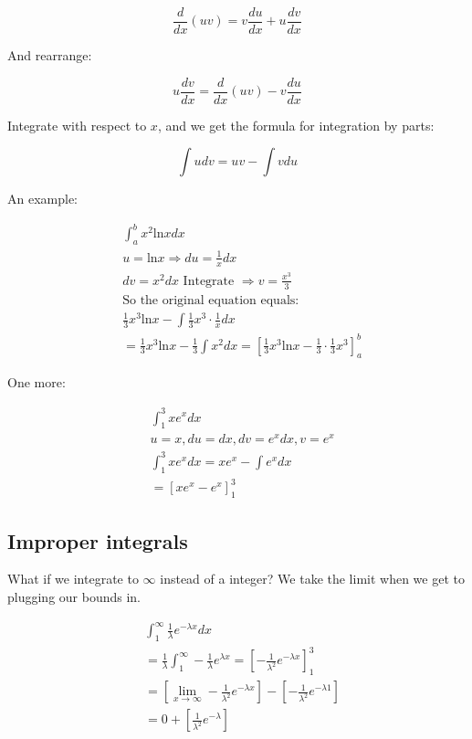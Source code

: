 \begin{equation*}
    \frac{d}{dx}(uv) = v \frac{du}{dx} + u \frac{dv}{dx} 
\end{equation*}

And rearrange: 

\begin{equation*}
    u \frac{dv}{dx} = \frac{d}{dx}(uv) - v \frac{du}{dx}
\end{equation*}

Integrate with respect to $x$, and we get the formula for integration by parts:

\begin{equation*}
    \int u dv = uv - \int v du
\end{equation*}

An example: 

\begin{align*}
    &\int_a^b x^2 \text{ln}x dx \\
    &u = \text{ln}x \Rightarrow du = \frac{1}{x}dx \\
    &dv = x^2 dx \text{ Integrate } \Rightarrow v = \frac{x^3}{3} \\
    &\text{So the original equation equals:} \\
    &\frac{1}{3}x^3 \text{ln}x - \int\frac{1}{3}x^3 \cdot\frac{1}{x}dx \\
    & = \frac{1}{3}x^3 \text{ln}x - \frac{1}{3}\int x^2 dx = \left[\frac{1}{3}x^3 \text{ln}x - \frac{1}{3}\cdot\frac{1}{3}x^3\right]_a^b
\end{align*}

One more: 

\begin{align*}
    & \int_1^3 xe^x dx \\
    & u = x, du = dx, dv = e^xdx, v = e^x \\
    & \int_1^3 xe^x dx = xe^x - \int e^xdx \\ 
    & = \left[xe^x - e^x\right]_1^3
\end{align*}


\subsection{Improper integrals}

What if we integrate to $\infty$ instead of a integer? We take the limit when we get to plugging our bounds in.

\begin{align*}
    & \int_1^\infty \frac{1}{\lambda}e^{-\lambda x}dx \\
    & = \frac{1}{\lambda}\int_1^\infty -\frac{1}{\lambda} e^{\lambda x} = \left[-\frac{1}{\lambda^2}e^{-\lambda x}\right]_1^3 \\ 
    & = \left[\lim_{x \rightarrow \infty} -\frac{1}{\lambda^2} e^{-\lambda x}\right] - \left[-\frac{1}{\lambda^2} e^{-\lambda 1}\right] \\
    & = 0 + \left[\frac{1}{\lambda^2} e^{-\lambda}\right]
\end{align*}